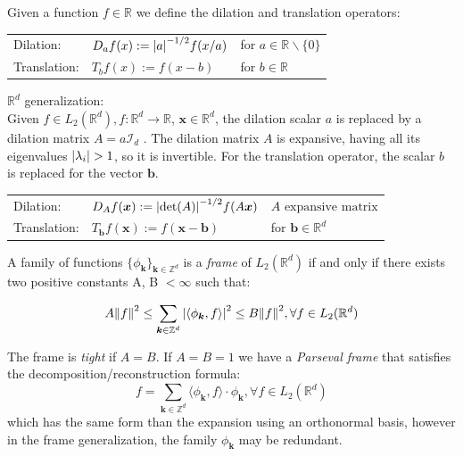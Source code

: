 \begin{definition}\label{def:D_T}
  Given a function $f\in\mathbb{R}$ we define the dilation and translation operators\cite{heil_continuous_1989}:\par
  \begin{tabular}{lll}
    Dilation:&  $D_a f(x):=\abs{a}^{-1/2}f(x/a)$ &for $a \in \mathbb{R}\backslash\{0\}$ \\
    Translation:&   $T_b f(x):=f(x-b)$ &for $b \in \mathbb{R}$ \\
  \end{tabular}

  $\mathbb{R}^d$ generalization:\\
  Given $f \in L_2(\mathbb{R}^d), f:\mathbb{R}^d \rightarrow \mathbb{R}$, $\bm{x}\in\mathbb{R}^d$, the dilation scalar $a$ is replaced by a dilation matrix $A = a \mathcal{I}_d$ \cite{qian_wavelet_2007}. The dilation matrix $A$ is expansive, having all its eigenvalues $\abs{\lambda_i} > 1$, so it is invertible. For the translation operator, the scalar $b$ is replaced for the vector $\bm{b}$.\par
  \begin{tabular}{lll}
    Dilation:& $D_A f(\bm{x}):=\abs{\det(A)}^{-1/2}f(A\bm{x})$ &$A \text{ expansive matrix}$\\
    Translation:&   $T_{\bm{b}} f(\bm{x}):=f(\bm{x}-\bm{b})$ &for $\bm{b} \in \mathbb{R}^d$ \\
  \end{tabular}
\end{definition}

\begin{definition}[Frame]\label{def:frame}
    A family of functions $\{\phi_{\bm{k}}\}_{ \bm{k}\in\mathbb{Z}^d}$ is a \textit{frame} of $L_2(\mathbb{R}^d)$ if and only if there exists two positive constants A, B $< \infty$ such that:

\begin{equation}
  A\norm{f}^2 \le \sum_{\bm{k}\in\mathbb{Z}^d}\abs{\langle\phi_{\bm{k}},f\rangle}^2 \le B\norm{f}^2, \forall f \in L_2(\mathbb{R}^d)
\end{equation}

The frame is \textit{tight} if $A=B$. If $A=B=1$ we have a \textit{Parseval frame} that satisfies the decomposition/reconstruction formula:
\begin{equation}
  f = \sum_{\bm{k}\in\mathbb{Z}^d}\langle\phi_{\bm{k}},f\rangle \cdot \phi_{\bm{k}}, \forall f \in L_2(\mathbb{R}^d)
\end{equation}
which has the same form than the expansion using an orthonormal basis, however in the frame generalization, the family $\phi_{\bm{k}}$ may be redundant.
\end{definition}

